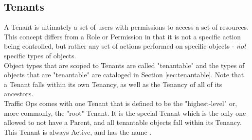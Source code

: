 %
%

\subsection{Tenants}
A Tenant is ultimately a set of users with permissions to access a set of
resources. This concept differs from a Role or Permission in that it is not
a specific action being controlled, but rather any set of actions performed on
specific objects - \emph{not} specific types of objects.\\
Object types that are scoped to Tenants are called "tenantable" and the types
of objects that are "tenantable" are cataloged in Section
\ref{sec:tenantable}. Note that a Tenant falls within its own Tenancy, as well
as the Tenancy of all of its ancestors.\\
Traffic Ops comes with one Tenant that is defined to be the "highest-level" or,
more commonly, the "root" Tenant. It is the special Tenant which is the only
one allowed to not have a Parent, and all tenantable objects fall within its
Tenancy. This Tenant is always Active, and has the name .

